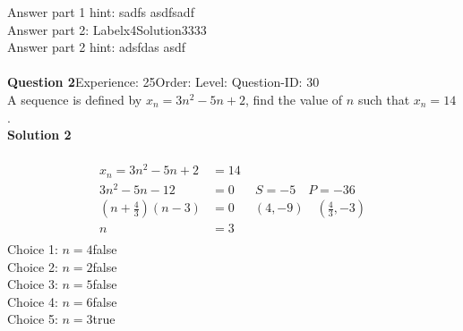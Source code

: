 \documentclass{article}
\begin{document}
Answer part 1 hint: \hspace{15pt}sadfs asdfsadf\\
Answer part 2: \hspace{10pt}Label\hspace{10pt}x4\hspace{10pt}Solution\hspace{10pt}3333\\
Answer part 2 hint: \hspace{15pt}adsfdas asdf\\
\\[4pt]
\noindent\textbf{Question 2}\hspace{20pt}Experience: 25\hspace{20pt}Order: \hspace{20pt}Level: \hspace{20pt}Question-ID: 30\\[2pt]
A sequence is defined by $x_n=3n^2-5n+2$, find the value of $n$ such that $x_n=14$.\\[4pt]
\noindent\textbf{Solution 2}\\[2pt]
\\[-35pt]\begin{align*}
x_n=3n^2-5n+2&=14\\[2pt]
3n^2-5n-12&=0 \hspace{20pt} S=-5 \quad P=-36\\[2pt]
\left(n+\displaystyle\frac{4}{3}\right)(n-3)&=0 \hspace{19pt} (4,-9) \quad \left(\displaystyle\frac{4}{3},-3\right)\\[2pt]
n&=3\\
\end{align*}
Choice 1: \hspace{20pt}$n=4$\hspace{20pt}false\\
Choice 2: \hspace{20pt}$n=2$\hspace{20pt}false\\
Choice 3: \hspace{20pt}$n=5$\hspace{20pt}false\\
Choice 4: \hspace{20pt}$n=6$\hspace{20pt}false\\
Choice 5: \hspace{20pt}$n=3$\hspace{20pt}true\\
\\[4pt]
\end{document}
